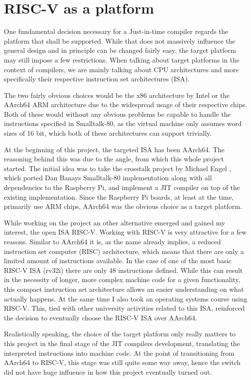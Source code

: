 \chapter{RISC-V as a platform}\label{cha:riscV}

One fundamental decision necessary for a Just-in-time compiler regards the platform that shall be supported. 
While that does not massively influence the general design and in principle can be changed fairly easy, the target platform may still impose a few restrictions. 
When talking about target platforms in the context of compilers, we are mainly talking about CPU architectures and more specifically their respective instruction set architectures (ISA). 

The two fairly obvious choices would be the x86 architecture by Intel or the AArch64 ARM architecture due to the widespread usage of their respective chips. 
Both of these would without any obvious problems be capable to handle the instructions specified in Smalltalk-80, as the virtual machine only assumes word sizes of 16 bit, which both of these architectures can support trivially. 

At the beginning of this project, the targeted ISA has been AArch64. The reasoning behind this was due to the angle, from which this whole project started. 
The initial idea was to take the crosstalk project by Michael Engel \cite{crosstalk}, which ported Dan Banays Smalltalk-80 implementation \cite{dbanayST} along with all dependencies to the Raspberry Pi, and implement a JIT compiler on top of the existing implementation.
Since the Raspberry Pi boards, at least at the time, primarily use ARM chips, AArch64 was the obvious choice as a target platform. 

While working on the project an other alternative emerged and gained my interest, the open ISA RISC-V.
Working with RISC-V is very attractive for a few reasons. 
Similar to AArch64 it is, as the name already implies, a reduced instruction set computer (RISC) architecture, which means that there are only a limited amount of instructions available.
In the case of one of the most basic RISC-V ISA (rv32i) there are only 48 instructions defined.
While this can result in the necessity of longer, more complex machine code for a given functionality, this compact instruction set architecture allows an easier understanding on what actually happens.
At the same time I also took an operating systems course using RISC-V.
This, tied with other university activities related to this ISA, reinforced the decision to eventually choose the RISC-V ISA over AArch64. 

Realistically speaking, the choice of the target platform only really matters to this project in the final stage of the JIT compilers development, translating the interpreted instructions into machine code.
At the point of transitioning from AArch64 to RISC-V, this stage was still quite some way away, hence the switch did not have huge influence in how this project eventually turned out.
